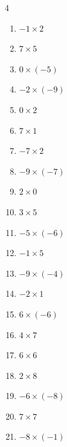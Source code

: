 \begin{multicols}{4}
\begin{enumerate}
  \item $-1\times 2$
        \phantom{$=-2$}

  \item $7\times 5$
        \phantom{$=35$}

  \item $0\times (-5)$
        \phantom{$=0$}

  \item $-2\times (-9)$
        \phantom{$=18$}

  \item $0\times 2$
        \phantom{$=0$}

  \item $7\times 1$
        \phantom{$=7$}

  \item $-7\times 2$
        \phantom{$=-14$}

  \item $-9\times (-7)$
        \phantom{$=63$}

\columnbreak %

  \item $2\times 0$
        \phantom{$=0$}

  \item $3\times 5$
        \phantom{$=15$}

  \item $-5\times (-6)$
        \phantom{$=30$}

  \item $-1\times 5$
        \phantom{$=-5$}

  \item $-9\times (-4)$
        \phantom{$=36$}

  \item $-2\times 1$
        \phantom{$=-2$}

  \item $6\times (-6)$
        \phantom{$=-36$}

  \item $4\times 7$
        \phantom{$=28$}

  \item $6\times 6$
        \phantom{$=36$}

  \item $2\times 8$
        \phantom{$=16$}

  \item $-6\times (-8)$
        \phantom{$=48$}

  \item $7\times 7$
        \phantom{$=49$}

  \item $-8\times (-1)$
        \phantom{$=8$}


\end{enumerate}
\end{multicols}
